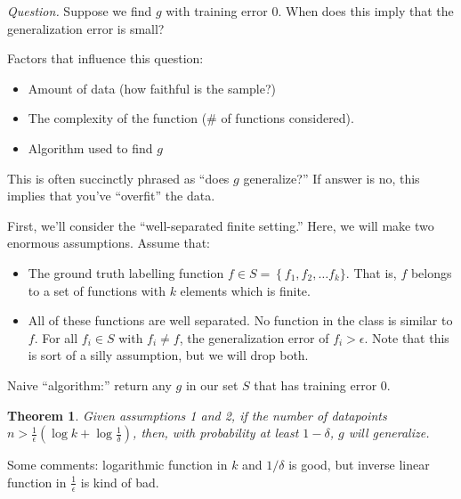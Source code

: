 \documentclass[12pt]{article}
\newtheorem*{theorem}{Theorem}
\newcommand{\eps}{\epsilon}
\begin{document}
{\it Question.} Suppose we find $g$ with training error 0.  When does this imply that the generalization error is small?

Factors that influence this question:

\begin{itemize}
  \item Amount of data (how faithful is the sample?)
  \item The complexity of the function (\# of functions considered).
  \item Algorithm used to find $g$
\end{itemize}

This is often succinctly phrased as ``does $g$ generalize?''  If answer is no, this implies that you've ``overfit'' the data.

First, we'll consider the ``well-separated finite setting.''  Here, we will make two enormous assumptions.  Assume that:

\begin{itemize}
  \item The ground truth labelling function $f \in S = \left\{ f_1, f_2, \dots f_k \}$.  That is, $f$ belongs to a set of functions with $k$ elements which is finite.
  \item All of these functions are well separated.  No function in the class is similar to $f$.  For all $f_i \in S$ with $f_i \neq f$, the generalization error of $f_i > \eps$.  Note that this is sort of a silly assumption, but we will drop both.
\end{itemize}

Naive ``algorithm:'' return any $g$ in our set $S$ that has training error 0.

\begin{theorem}
  Given assumptions 1 and 2, if the number of datapoints $n > \frac{1}{\eps} (\log k + \log \frac{1}{\delta} )$, then, with probability at least $1 - \delta$, $g$ will generalize.
\end{theorem}

Some comments: logarithmic function in $k$ and $1/\delta$ is good, but inverse linear function in $\frac{1}{ \eps}$ is kind of bad.
\end{document}
